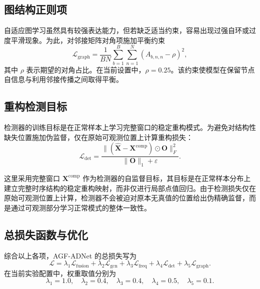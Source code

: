 \documentclass[bachelor, vlined]{DissertUESTC}
\begin{document}
    \subsection{图结构正则项}

    自适应图学习虽然具有较强表达能力，但若缺乏适当约束，容易出现过强自环或过度平滑现象。为此，对邻接矩阵对角项施加平衡约束
    \begin{equation}
        \mathcal{L}_{\mathrm{graph}}
        =
        \frac{1}{BN}
        \sum_{b=1}^{B}\sum_{n=1}^{N}
        \left(
            A_{b,n,n} - \rho
        \right)^2,
    \end{equation}
    其中 $\rho$ 表示期望的对角占比。在当前设置中，$\rho=0.25$。该约束使模型在保留节点自信息与利用邻接传播之间取得平衡。

    \subsection{重构检测目标}

    检测器的训练目标是在正常样本上学习完整窗口的稳定重构模式。为避免对结构性缺失位置施加伪监督，仅在原始可观测位置上计算重构损失：
    \begin{equation}
        \mathcal{L}_{\mathrm{det}}
        =
        \frac{\|(\hat{\mathbf{X}}-\mathbf{X}^{\mathrm{comp}}) \odot \mathbf{O}\|_F^2}{\|\mathbf{O}\|_1 + \varepsilon}.
    \end{equation}

    这里采用完整窗口 $\mathbf{X}^{\mathrm{comp}}$ 作为检测器的自监督目标，其目标是在正常样本分布上建立完整时序结构的稳定重构映射，而非仅进行局部点值回归。由于检测损失仅在原始可观测位置上计算，检测器不会被迫对原本无真值的位置给出伪精确监督，而是通过可观测部分学习正常模式的整体一致性。

    \subsection{总损失函数与优化}

    综合以上各项，AGF-ADNet 的总损失写为
    \begin{equation}
        \mathcal{L}
        =
        \lambda_1 \mathcal{L}_{\mathrm{fusion}}
        +
        \lambda_2 \mathcal{L}_{\mathrm{gcn}}
        +
        \lambda_3 \mathcal{L}_{\mathrm{freq}}
        +
        \lambda_4 \mathcal{L}_{\mathrm{det}}
        +
        \lambda_5 \mathcal{L}_{\mathrm{graph}}.
    \end{equation}
    在当前实验配置中，权重取值分别为
    \begin{equation}
        \lambda_1 = 1.0, \quad
        \lambda_2 = 0.4, \quad
        \lambda_3 = 0.4, \quad
        \lambda_4 = 0.5, \quad
        \lambda_5 = 0.1.
    \end{equation}
\end{document}
